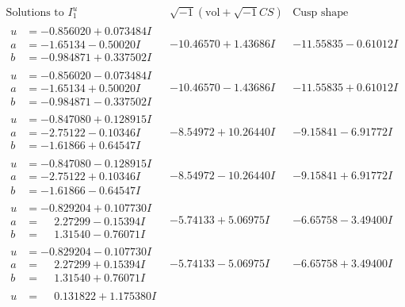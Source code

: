 \documentclass[1p]{elsarticle_modified}
\theoremstyle{definition}
\newcommand{\I}{\sqrt{-1}}
\begin{document}
$$\begin{array}{c|c|c}  
\text{Solutions to }I^u_{1}& \I (\text{vol} + \sqrt{-1}CS) & \text{Cusp shape}\\
 \hline 
\begin{aligned}
u &= -0.856020 + 0.073484 I \\
a &= -1.65134 - 0.50020 I \\
b &= -0.984871 + 0.337502 I\end{aligned}
 & -10.46570 + 1.43686 I & -11.55835 - 0.61012 I \\ \hline\begin{aligned}
u &= -0.856020 - 0.073484 I \\
a &= -1.65134 + 0.50020 I \\
b &= -0.984871 - 0.337502 I\end{aligned}
 & -10.46570 - 1.43686 I & -11.55835 + 0.61012 I \\ \hline\begin{aligned}
u &= -0.847080 + 0.128915 I \\
a &= -2.75122 - 0.10346 I \\
b &= -1.61866 + 0.64547 I\end{aligned}
 & -8.54972 + 10.26440 I & -9.15841 - 6.91772 I \\ \hline\begin{aligned}
u &= -0.847080 - 0.128915 I \\
a &= -2.75122 + 0.10346 I \\
b &= -1.61866 - 0.64547 I\end{aligned}
 & -8.54972 - 10.26440 I & -9.15841 + 6.91772 I \\ \hline\begin{aligned}
u &= -0.829204 + 0.107730 I \\
a &= \phantom{-}2.27299 - 0.15394 I \\
b &= \phantom{-}1.31540 - 0.76071 I\end{aligned}
 & -5.74133 + 5.06975 I & -6.65758 - 3.49400 I \\ \hline\begin{aligned}
u &= -0.829204 - 0.107730 I \\
a &= \phantom{-}2.27299 + 0.15394 I \\
b &= \phantom{-}1.31540 + 0.76071 I\end{aligned}
 & -5.74133 - 5.06975 I & -6.65758 + 3.49400 I \\ \hline\begin{aligned}
u &= \phantom{-}0.131822 + 1.175380 I \\

\end{aligned}
\end{array}$$
\end{document}
